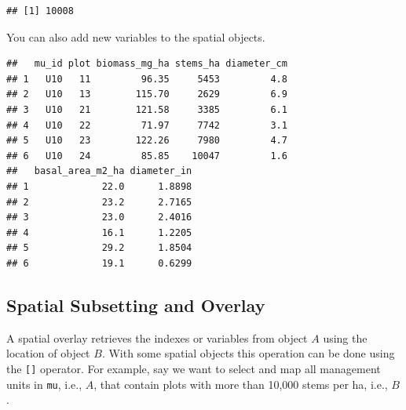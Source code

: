 \documentclass[
]{krantz}
\newenvironment{Shaded}{\begin{snugshade}}{\end{snugshade}}
\newcommand{\FloatTok}[1]{\textcolor[rgb]{0.00,0.00,0.81}{#1}}
\newcommand{\KeywordTok}[1]{\textcolor[rgb]{0.13,0.29,0.53}{\textbf{#1}}}
\newcommand{\NormalTok}[1]{#1}
\newcommand{\OperatorTok}[1]{\textcolor[rgb]{0.81,0.36,0.00}{\textbf{#1}}}
\newcommand{\StringTok}[1]{\textcolor[rgb]{0.31,0.60,0.02}{#1}}
\begin{document}
\begin{verbatim}
## [1] 10008
\end{verbatim}

You can also add new variables to the spatial objects.

\begin{Shaded}
\end{Shaded}

\begin{verbatim}
##   mu_id plot biomass_mg_ha stems_ha diameter_cm
## 1   U10   11         96.35     5453         4.8
## 2   U10   13        115.70     2629         6.9
## 3   U10   21        121.58     3385         6.1
## 4   U10   22         71.97     7742         3.1
## 5   U10   23        122.26     7980         4.7
## 6   U10   24         85.85    10047         1.6
##   basal_area_m2_ha diameter_in
## 1             22.0      1.8898
## 2             23.2      2.7165
## 3             23.0      2.4016
## 4             16.1      1.2205
## 5             29.2      1.8504
## 6             19.1      0.6299
\end{verbatim}

\hypertarget{spatial-subsetting-and-overlay}{%
\subsection{Spatial Subsetting and Overlay}\label{spatial-subsetting-and-overlay}}

A spatial overlay retrieves the indexes or variables from object \(A\) using the location of object \(B\). With some spatial objects this operation can be done using the \texttt{{[}{]}} operator. For example, say we want to select and map all management units in \texttt{mu}, i.e., \(A\), that contain plots with more than 10,000 stems per ha, i.e., \(B\).
\end{document}
